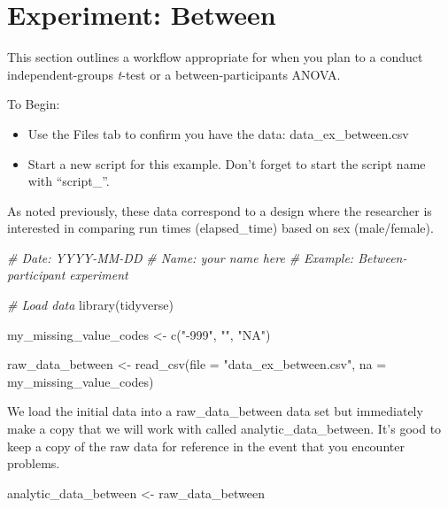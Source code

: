 \documentclass[
]{krantz}
\makeatletter
\newenvironment{Shaded}{\begin{snugshade}}{\end{snugshade}}
\newcommand{\AttributeTok}[1]{\textcolor[rgb]{0.61,0.61,0.61}{#1}}
\newcommand{\CommentTok}[1]{\textcolor[rgb]{0.37,0.37,0.37}{\textit{#1}}}
\newcommand{\FunctionTok}[1]{\textcolor[rgb]{0,0,0}{#1}}
\newcommand{\NormalTok}[1]{#1}
\newcommand{\OtherTok}[1]{\textcolor[rgb]{0.37,0.37,0.37}{#1}}
\newcommand{\StringTok}[1]{\textcolor[rgb]{0.5,0.5,0.5}{#1}}
\newenvironment{kframe}{%
\medskip{}
\setlength{\fboxsep}{.8em}
 \def\at@end@of@kframe{}%
 \ifinner\ifhmode%
  \def\at@end@of@kframe{\end{minipage}}%
  \begin{minipage}{\columnwidth}%
 \fi\fi%
 \def\FrameCommand##1{\hskip\@totalleftmargin \hskip-\fboxsep
 \colorbox{shadecolor}{##1}\hskip-\fboxsep
     \hskip-\linewidth \hskip-\@totalleftmargin \hskip\columnwidth}%
 \MakeFramed {\advance\hsize-\width
   \@totalleftmargin\z@ \linewidth\hsize
   \@setminipage}}%
 {\par\unskip\endMakeFramed%
 \at@end@of@kframe}
\renewenvironment{Shaded}{\begin{kframe}}{\end{kframe}}
\makeatother
\begin{document}
\hypertarget{experiment-between}{%
\section{Experiment: Between}\label{experiment-between}}

This section outlines a workflow appropriate for when you plan to a conduct independent-groups \emph{t}-test or a between-participants ANOVA.

To Begin:

\begin{itemize}
\item
  Use the Files tab to confirm you have the data: data\_ex\_between.csv
\item
  Start a new script for this example. Don't forget to start the script name with ``script\_''.
\end{itemize}

As noted previously, these data correspond to a design where the researcher is interested in comparing run times (elapsed\_time) based on sex (male/female).

\begin{Shaded}
\begin{Highlighting}[]
\CommentTok{\# Date: YYYY{-}MM{-}DD}
\CommentTok{\# Name: your name here}
\CommentTok{\# Example: Between{-}participant experiment}

\CommentTok{\# Load data}
\FunctionTok{library}\NormalTok{(tidyverse)}

\NormalTok{my\_missing\_value\_codes }\OtherTok{\textless{}{-}} \FunctionTok{c}\NormalTok{(}\StringTok{"{-}999"}\NormalTok{, }\StringTok{""}\NormalTok{, }\StringTok{"NA"}\NormalTok{)}

\NormalTok{raw\_data\_between }\OtherTok{\textless{}{-}} \FunctionTok{read\_csv}\NormalTok{(}\AttributeTok{file =} \StringTok{"data\_ex\_between.csv"}\NormalTok{,}
                     \AttributeTok{na =}\NormalTok{ my\_missing\_value\_codes)}
\end{Highlighting}
\end{Shaded}

We load the initial data into a raw\_data\_between data set but immediately make a copy that we will work with called analytic\_data\_between. It's good to keep a copy of the raw data for reference in the event that you encounter problems.

\begin{Shaded}
\begin{Highlighting}[]
\NormalTok{analytic\_data\_between }\OtherTok{\textless{}{-}}\NormalTok{ raw\_data\_between}
\end{Highlighting}
\end{Shaded}
\end{document}
